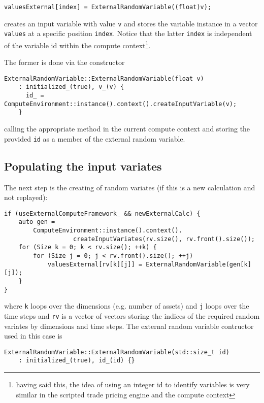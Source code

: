 \documentclass[12pt, a4paper]{article}
\begin{document}
\begin{verbatim}
valuesExternal[index] = ExternalRandomVariable((float)v);
\end{verbatim}

creates an input variable with value \verb+v+ and stores the variable instance in a vector \verb+values+ at a specific
position \verb+index+. Notice that the latter \verb+index+ is independent of the variable id within the compute
context\footnote{having said this, the idea of using an integer id to identify variables is very similar in the scripted
trade pricing engine and the compute context}.

The former is done via the constructor

\begin{verbatim}
ExternalRandomVariable::ExternalRandomVariable(float v)
    : initialized_(true), v_(v) {
      id_ = ComputeEnvironment::instance().context().createInputVariable(v);
    }
\end{verbatim}

calling the appropriate method in the current compute context and storing the provided \verb+id+ as a member of the
external random variable.

\subsection{Populating the input variates}

The next step is the creating of random variates (if this is a new calculation and not replayed):

\begin{verbatim}
if (useExternalComputeFramework_ && newExternalCalc) {
    auto gen =
        ComputeEnvironment::instance().context().
                   createInputVariates(rv.size(), rv.front().size());
    for (Size k = 0; k < rv.size(); ++k) {
        for (Size j = 0; j < rv.front().size(); ++j)
            valuesExternal[rv[k][j]] = ExternalRandomVariable(gen[k][j]);
    }
}
\end{verbatim}

where \verb+k+ loops over the dimensions (e.g. number of assets) and \verb+j+ loops over the time steps and \verb+rv+ is
a vector of vectors storing the indices of the required random variates by dimensions and time steps. The external
random variable contructor used in this case is

\begin{verbatim}
ExternalRandomVariable::ExternalRandomVariable(std::size_t id)
    : initialized_(true), id_(id) {}
\end{verbatim}
\end{document}
